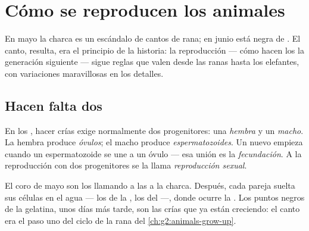 \chapter{Cómo se reproducen los animales}\label{ch:g4:animal-reproduction}

En mayo la charca es un escándalo de cantos de rana; en junio está
negra de . El canto, resulta, era el principio de la
historia: la reproducción --- cómo hacen los  la generación
siguiente --- sigue reglas que valen desde las ranas hasta los
elefantes, con variaciones maravillosas en los detalles.

\section{Hacen falta dos}

\begin{definition}\label{def:g4:animal-reproduction:sexual}
En los , hacer crías exige normalmente dos progenitores: una
\emph{hembra} y un \emph{macho}. La hembra
produce \emph{óvulos}; el macho produce
\emph{espermatozoides}. Un  nuevo empieza
cuando un espermatozoide se une a un óvulo --- esa unión es la
\emph{fecundación}. A la reproducción con dos
progenitores se la llama \emph{reproducción
sexual}.
\end{definition}

\begin{example}\label{ex:g4:animal-reproduction:song}
El coro de mayo son los  llamando a las  a la charca.
Después, cada pareja suelta sus células en el agua --- los  de
la , los  del  ---, donde ocurre la
. Los puntos negros de la gelatina, unos días más tarde,
son las crías que ya están creciendo: el canto era el paso uno del
ciclo de la rana del \cref{ch:g2:animals-grow-up}.
\end{example}

